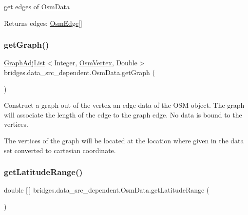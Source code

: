 get edges of \hyperlink{classbridges_1_1data__src__dependent_1_1_osm_data}{Osm\+Data} \begin{DoxyReturn}{Returns}
edges\+: \hyperlink{classbridges_1_1data__src__dependent_1_1_osm_edge}{Osm\+Edge}\mbox{[}\mbox{]} 
\end{DoxyReturn}
\mbox{\label{classbridges_1_1data__src__dependent_1_1_osm_data_a4f5282b7b11ef6e4a248a05c35fe3787}} 
\subsubsection{\texorpdfstring{get\+Graph()}{getGraph()}}
{\footnotesize\ttfamily \hyperlink{classbridges_1_1base_1_1_graph_adj_list}{Graph\+Adj\+List}$<$Integer, \hyperlink{classbridges_1_1data__src__dependent_1_1_osm_vertex}{Osm\+Vertex}, Double$>$ bridges.\+data\+\_\+src\+\_\+dependent.\+Osm\+Data.\+get\+Graph (\begin{DoxyParamCaption}{ }\end{DoxyParamCaption})}

Construct a graph out of the vertex an edge data of the O\+SM object. The graph will associate the length of the edge to the graph edge. No data is bound to the vertices.

The vertices of the graph will be located at the location where given in the data set converted to cartesian coordinate. \mbox{\label{classbridges_1_1data__src__dependent_1_1_osm_data_a406042fe56541f04c059a1f1ec887c81}} 
\subsubsection{\texorpdfstring{get\+Latitude\+Range()}{getLatitudeRange()}}
{\footnotesize\ttfamily double \mbox{[}$\,$\mbox{]} bridges.\+data\+\_\+src\+\_\+dependent.\+Osm\+Data.\+get\+Latitude\+Range (\begin{DoxyParamCaption}{ }\end{DoxyParamCaption})}

